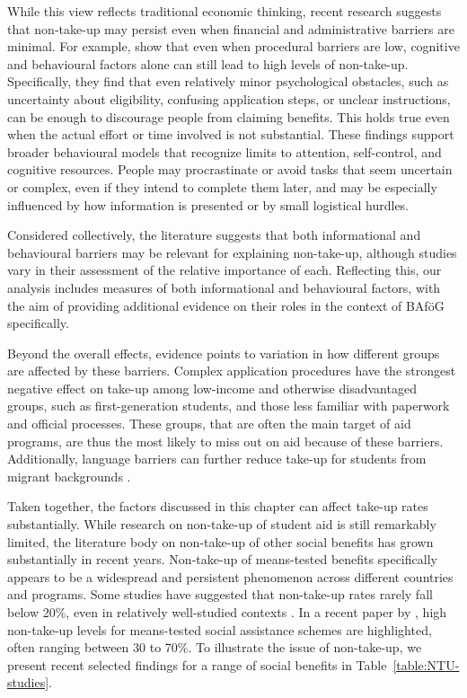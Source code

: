 While this view reflects traditional economic thinking, recent research suggests that non-take-up may persist even when financial and administrative barriers are minimal. 
For example, \cite{bhargava_psychological_2015} show that even when procedural barriers are low, cognitive and behavioural factors alone can still lead to high levels of non-take-up. 
Specifically, they find that even relatively minor psychological obstacles, such as uncertainty about eligibility, confusing application steps, or unclear instructions, can be enough to discourage people from claiming benefits. 
This holds true even when the actual effort or time involved is not substantial. 
These findings support broader behavioural models that recognize limits to attention, self-control, and cognitive resources. 
People may procrastinate or avoid tasks that seem uncertain or complex, even if they intend to complete them later, and may be especially influenced by how information is presented or by small logistical hurdles.

Considered collectively, the literature suggests that both informational and behavioural barriers may be relevant for explaining non-take-up, although studies vary in their assessment of the relative importance of each. Reflecting this, our analysis includes measures of both informational and behavioural factors, with the aim of providing additional evidence on their roles in the context of BAföG specifically.

Beyond the overall effects, evidence points to variation in how different groups are affected by these barriers. Complex application procedures have the strongest negative effect on take-up among low-income and otherwise disadvantaged groups, such as first-generation students, and those less familiar with paperwork and official processes. These groups, that are often the main target of aid programs, are thus the most likely to miss out on aid because of these barriers. Additionally, language barriers can further reduce take-up for students from migrant backgrounds \citep{dynarski_cost_2006, bhargava_psychological_2015}.


Taken together, the factors discussed in this chapter can affect take-up rates substantially. While research on non-take-up of student aid is still remarkably limited, the literature body on non-take-up of other social benefits has grown substantially in recent years. Non-take-up of means-tested benefits specifically appears to be a widespread and persistent phenomenon across different countries and programs. Some studies have suggested that non-take-up rates rarely fall below 20\%, even in relatively well-studied contexts \citep{vanoorschot_failing_2002}. In a recent paper by \cite{goedeme_concept_2020}, high non-take-up levels for means-tested social assistance schemes are highlighted, often ranging between 30 to 70\%. To illustrate the issue of non-take-up, we present recent selected findings for a range of social benefits in Table~\ref{table:NTU-studies}.

